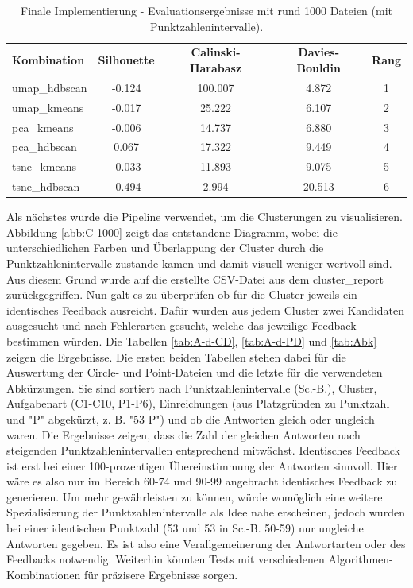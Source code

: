 \setlength{\tabcolsep}{5.5pt}
\begin{table}[h]
\centering
\begin{tabular}{lcccc}
\hline
\textbf{Kombination} & \textbf{Silhouette} & \textbf{Calinski-Harabasz} & \textbf{Davies-Bouldin} & \textbf{Rang} \\
umap\_hdbscan   & -0.124 & 100.007 & 4.872 & 1 \\
umap\_kmeans    & -0.017 & 25.222  & 6.107 & 2 \\
pca\_kmeans     & -0.006 & 14.737  & 6.880 & 3 \\
pca\_hdbscan    &  0.067 & 17.322  & 9.449 & 4 \\
tsne\_kmeans    & -0.033 & 11.893  & 9.075 & 5 \\
tsne\_hdbscan   & -0.494 & 2.994   & 20.513 & 6 \\
\hline
\end{tabular}
\caption{Finale Implementierung - Evaluationsergebnisse mit rund 1000 Dateien (mit Punktzahlenintervalle).}
\label{tab:FI-EI-EV-160-mPI}
\end{table}

Als nächstes wurde die Pipeline verwendet, um die Clusterungen zu visualisieren. Abbildung \ref{abb:C-1000} zeigt das entstandene Diagramm, wobei die unterschiedlichen Farben und Überlappung der Cluster durch die Punktzahlenintervalle zustande kamen und damit visuell weniger wertvoll sind. Aus diesem Grund wurde auf die erstellte CSV-Datei aus dem cluster\_report zurückgegriffen. Nun galt es zu überprüfen ob für die Cluster jeweils ein identisches Feedback ausreicht. Dafür wurden aus jedem Cluster zwei Kandidaten ausgesucht und nach Fehlerarten gesucht, welche das jeweilige Feedback bestimmen würden. Die Tabellen \ref{tab:A-d-CD}, \ref{tab:A-d-PD} und \ref{tab:Abk} zeigen die Ergebnisse. Die ersten beiden Tabellen stehen dabei für die Auswertung der Circle- und Point-Dateien und die letzte für die verwendeten Abkürzungen. Sie sind sortiert nach Punktzahlenintervalle (Sc.-B.), Cluster, Aufgabenart (C1-C10, P1-P6), Einreichungen (aus Platzgründen zu Punktzahl und "P" abgekürzt, z. B. "53 P") und ob die Antworten gleich oder ungleich waren. Die Ergebnisse zeigen, dass die Zahl der gleichen Antworten nach steigenden Punktzahlenintervallen entsprechend mitwächst. Identisches Feedback ist erst bei einer 100-prozentigen Übereinstimmung der Antworten sinnvoll. Hier wäre es also nur im Bereich 60-74 und 90-99 angebracht identisches Feedback zu generieren. Um mehr gewährleisten zu können, würde womöglich eine weitere Spezialisierung der Punktzahlenintervalle als Idee nahe erscheinen, jedoch wurden bei einer identischen Punktzahl (53 und 53 in Sc.-B. 50-59) nur ungleiche Antworten gegeben. Es ist also eine Verallgemeinerung der Antwortarten oder des Feedbacks notwendig. Weiterhin könnten Tests mit verschiedenen Algorithmen-Kombinationen für präzisere Ergebnisse sorgen.

